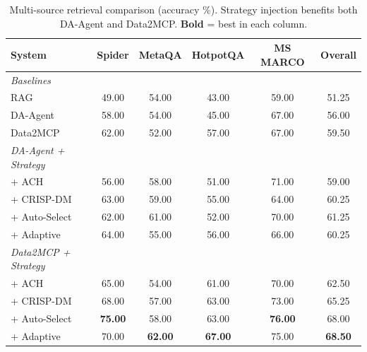 \begin{table}[!t]
  \centering
  \caption{Multi-source retrieval comparison (accuracy \%). Strategy injection benefits both DA-Agent and Data2MCP. \textbf{Bold} = best in each column.}
  \label{tab:multisource_multi}
  {\setlength{\tabcolsep}{4pt}
  \begin{tabular*}{\textwidth}{@{\extracolsep{\fill}}lccccc}
    \toprule
    \textbf{System} & \textbf{Spider} & \textbf{MetaQA} & \textbf{HotpotQA} & \textbf{MS MARCO} & \textbf{Overall} \\
    \midrule
    \textit{Baselines} \\
    RAG                 & 49.00 & 54.00 & 43.00 & 59.00 & 51.25 \\
    DA-Agent            & 58.00 & 54.00 & 45.00 & 67.00 & 56.00 \\
    Data2MCP            & 62.00 & 52.00 & 57.00 & 67.00 & 59.50 \\
    \midrule
    \textit{DA-Agent + Strategy} \\
    + ACH               & 56.00 & 58.00 & 51.00 & 71.00 & 59.00 \\
    + CRISP-DM          & 63.00 & 59.00 & 55.00 & 64.00 & 60.25 \\
    + Auto-Select       & 62.00 & 61.00 & 52.00 & 70.00 & 61.25 \\
    + Adaptive          & 64.00 & 55.00 & 56.00 & 66.00 & 60.25 \\
    \midrule
    \textit{Data2MCP + Strategy} \\
    + ACH               & 65.00 & 54.00 & 61.00 & 70.00 & 62.50 \\
    + CRISP-DM          & 68.00 & 57.00 & 63.00 & 73.00 & 65.25 \\
    + Auto-Select       & \textbf{75.00} & 58.00 & 63.00 & \textbf{76.00} & 68.00 \\
    + Adaptive          & 70.00 & \textbf{62.00} & \textbf{67.00} & 75.00 & \textbf{68.50} \\
    \bottomrule
  \end{tabular*}
  }
\end{table}



